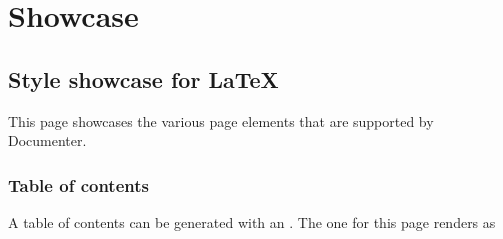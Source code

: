\newcommand{\DocMainTitle}{Documenter LaTeX Showcase}
\newcommand{\DocVersion}{1.2.3}
\newcommand{\DocAuthors}{}
\newcommand{\JuliaVersion}{1.8.1}




\part{Showcase}


\chapter{Style showcase for \LaTeX}



\label{5852870456629818970}{}


This page showcases the various page elements that are supported by Documenter.



\section{Table of contents}



\label{11192443102986465861}{}


A table of contents can be generated with an . The one for this page renders as


